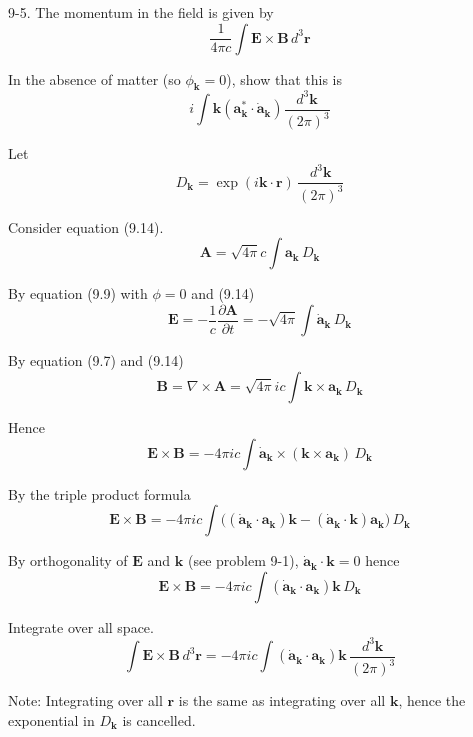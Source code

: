 \documentclass[12pt]{article}
\begin{document}
9-5.
The momentum in the field is given by
\begin{equation*}
\frac{1}{4\pi c}\int
\mathbf E\times\mathbf B\,d^3\mathbf r
\end{equation*}

In the absence of matter (so $\phi_{\mathbf k}=0$),
show that this is
\begin{equation*}
i\int\mathbf k\left(\mathbf a_{\mathbf k}^*\cdot\dot{\mathbf a}_{\mathbf k}\right)
\frac{d^3\mathbf k}{(2\pi)^3}
\end{equation*}

Let
\begin{equation*}
D_{\mathbf k}=\exp(i\mathbf k\cdot\mathbf r)\,\frac{d^3\mathbf k}{(2\pi)^3}
\end{equation*}

Consider equation (9.14).
\begin{equation*}
\mathbf A=\sqrt{4\pi}c\int\mathbf a_{\mathbf k}\,D_{\mathbf k}
\tag{9.14}
\end{equation*}

By equation (9.9) with $\phi=0$ and (9.14)
\begin{equation*}
\mathbf E=-\frac{1}{c}\frac{\partial\mathbf A}{\partial t}
=-\sqrt{4\pi}\int\dot{\mathbf a}_{\mathbf k}\,D_{\mathbf k}
\end{equation*}

By equation (9.7) and (9.14)
\begin{equation*}
\mathbf B=\nabla\times\mathbf A
=\sqrt{4\pi}ic\int\mathbf k\times\mathbf a_{\mathbf k}\,D_{\mathbf k}
\end{equation*}

Hence
\begin{equation*}
\mathbf E\times\mathbf B=-4\pi ic\int
\dot{\mathbf a}_{\mathbf k}
\times\left(\mathbf k\times\mathbf a_{\mathbf k}\right)\,D_{\mathbf k}
\end{equation*}

By the triple product formula
\begin{equation*}
\mathbf E\times\mathbf B=-4\pi ic\int
\big(
(\dot{\mathbf a}_{\mathbf k}\cdot\mathbf a_{\mathbf k})\mathbf k
-(\dot{\mathbf a}_{\mathbf k}\cdot\mathbf k)\mathbf a_{\mathbf k}
\big)\,D_{\mathbf k}
\end{equation*}

By orthogonality of $\mathbf E$ and $\mathbf k$ (see problem 9-1),
$\dot{\mathbf a}_{\mathbf k}\cdot\mathbf k=0$ hence
\begin{equation*}
\mathbf E\times\mathbf B
=-4\pi ic\int(\dot{\mathbf a}_{\mathbf k}\cdot\mathbf a_{\mathbf k})\mathbf k
\,D_{\mathbf k}
\end{equation*}

Integrate over all space.
\begin{equation*}
\int\mathbf E\times\mathbf B
\,d^3\mathbf r
=-4\pi ic\int(\dot{\mathbf a}_{\mathbf k}\cdot\mathbf a_{\mathbf k})\mathbf k
\,\frac{d^3\mathbf k}{(2\pi)^3}
\end{equation*}

Note: Integrating over all $\mathbf r$ is the same as integrating over all $\mathbf k$,
hence the exponential in $D_{\mathbf k}$ is cancelled.
\end{document}
